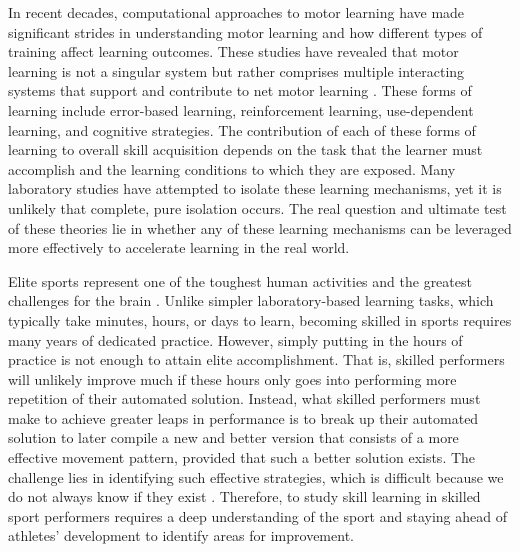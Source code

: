 In recent decades, computational approaches to motor learning have made significant strides in understanding motor learning and how different types of training affect learning outcomes. These studies have revealed that motor learning is not a singular system but rather comprises multiple interacting systems that support and contribute to net motor learning \cite{haith_model-based_2013, uehara_learning_2018}. These forms of learning include error-based learning, reinforcement learning, use-dependent learning, and cognitive strategies. The contribution of each of these forms of learning to overall skill acquisition depends on the task that the learner must accomplish and the learning conditions to which they are exposed. Many laboratory studies have attempted to isolate these learning mechanisms, yet it is unlikely that complete, pure isolation occurs. The real question and ultimate test of these theories lie in whether any of these learning mechanisms can be leveraged more effectively to accelerate learning in the real world.

Elite sports represent one of the toughest human activities and the greatest challenges for the brain \cite{walsh_is_2014}. Unlike simpler laboratory-based learning tasks, which typically take minutes, hours, or days to learn, becoming skilled in sports requires many years of dedicated practice.  However, simply putting in the hours of practice is not enough to attain elite accomplishment. That is, skilled performers will unlikely improve much if these hours only goes into performing more repetition of their automated solution. Instead, what skilled performers must make to achieve greater leaps in performance is to break up their automated solution to later compile a new and better version that consists of a more effective movement pattern, provided that such a better solution exists. The challenge lies in identifying such effective strategies, which is difficult because we do not always know if they exist \cite{gray_plateaus_2017}. Therefore, to study skill learning in skilled sport performers requires a deep understanding of the sport and staying ahead of athletes' development to identify areas for improvement.

